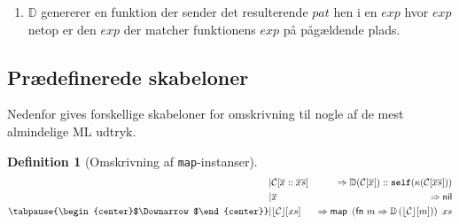 \documentclass[oneside]{memoir}
\newcommand{\floor}[1]{\ensuremath{\lfloor #1 \rfloor}}
\theoremstyle{definition}
\newtheorem{example}{Example}
\newtheorem{definition}{Definition}
\begin{document}
\begin{enumerate}
\begin{example}
\begin{tabular}{l|l|l}
      $(x::xs, y::ys)$ & $\mathcal{C}[\overline{x} :: \overline{xs}][\overline{y} :: \overline{ys}]$ &
      $(\diamond_1, \diamond_2)$ eller $(\diamond_2, \diamond_1)$\\
      
    \end{tabular}
    
  \end{example}

\item $\mathbb{D}$ genererer en funktion der sender det resulterende $pat$ hen i
  en $exp$ hvor $exp$ netop er den $exp$ der matcher funktionens $exp$ på
  pågældende plads.

\end{enumerate}

\subsection{Prædefinerede skabeloner}


Nedenfor gives forskellige skabeloner for omskrivning til nogle af de mest
almindelige ML udtryk.

\begin{definition}[Omskrivning af \texttt{map}-instanser] \ \\

  \begin{eqnarray*}[rqrl]
    | & \mathcal{C}  [\overline{x} :: \overline{xs}] &  => \mathbb{D}
    (\mathcal{C}[ \overline{x}]) :: \mathtt{self}(\kappa \mathsf{(} \mathcal{C} 
    [ \overline{xs} ] \mathsf{) )} \\
    | & \overline{x} & => \mathsf{nil} \\
   \tabpause{\begin{center}$\Downarrow$\end{center}}  
    | & \floor{\mathcal{C}} [ xs ] & => \textsf{map } \left( \textsf{fn } m =>
      \mathbb{D}\left( \floor{\mathcal{C}} [ m ] \right) \right) \ xs
  \end{eqnarray*}
\end{definition}
\end{document}
